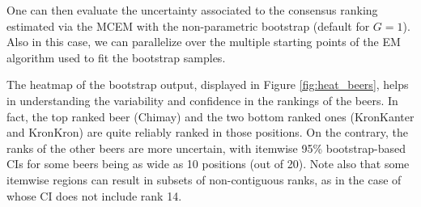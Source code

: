 One can then evaluate the uncertainty associated to the consensus ranking estimated via the MCEM with the non-parametric bootstrap (default for $G=1$). Also in this case, we can parallelize over the multiple starting points of the EM algorithm used to fit the bootstrap samples.
The heatmap of the bootstrap output, displayed in Figure \ref{fig:heat_beers}, helps in understanding the variability and confidence in the rankings of the beers. In fact, the top ranked beer (Chimay) and the two bottom ranked ones (KronKanter and KronKron) are quite reliably ranked in those positions. On the contrary, the ranks of the other beers are more uncertain, with itemwise  95\% bootstrap-based CIs for some beers being as wide as 10 positions (out of 20). Note also that some itemwise regions can result in subsets of non-contiguous ranks, as in the case of  whose CI does not include rank 14.
%

